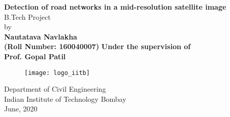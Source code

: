 \begin{titlepage}
  \vspace{3 cm}
  \begin{center}
  \large{\textbf{Detection of road networks in a mid-resolution satellite image}}\bigskip \\
  
  \vspace{3mm}
  \vfill
  B.Tech Project \\
  by \bigskip \\
  \textbf{Nautatava Navlakha\\(Roll Number: 160040007)}
  \vfill
  \textbf{Under the supervision of}\\
  \textbf{Prof. Gopal Patil}\\
\vfill  \begin{figure}[h]
  \texttt{[image: logo\_iitb]}
  \centering
  \end{figure}
  \vfill
  \large
  
Department of Civil Engineering\\
Indian Institute of Technology Bombay\\
June, 2020
\end{center}
\vfill %
\end{titlepage}
